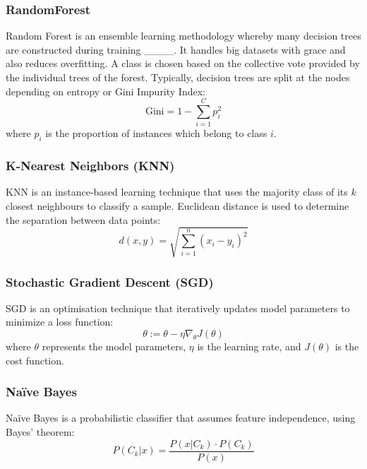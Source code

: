\vspace{\baselineskip}

\subsubsection{\textbf{RandomForest}}
Random Forest is an ensemble learning methodology whereby many decision trees are constructed during training ____. It handles big datasets with grace and also reduces overfitting. A class is chosen based on the collective vote provided by the individual trees of the forest. Typically, decision trees are split at the nodes depending on entropy or Gini Impurity Index:
\begin{equation}
    \text{Gini} = 1 - \sum_{i=1}^{C} p_i^2
\end{equation}
where \( p_i \) is the proportion of instances which belong to class \( i \).

\vspace{\baselineskip}

\subsubsection{\textbf{K-Nearest Neighbors (KNN)}}
KNN is an instance-based learning technique that uses the majority class of its \( k \) closest neighbours to classify a sample. Euclidean distance is used to determine the separation between data points:
\begin{equation}
    d(x, y) = \sqrt{\sum_{i=1}^{n} (x_i - y_i)^2}
\end{equation}
\vspace{\baselineskip}

\subsubsection{\textbf{Stochastic Gradient Descent (SGD)}}
SGD is an optimisation technique that iteratively updates model parameters to minimize a loss function:
\begin{equation}
    \theta := \theta - \eta \nabla_\theta J(\theta)
\end{equation}
where \( \theta \) represents the model parameters, \( \eta \) is the learning rate, and \( J(\theta) \) is the cost function.
\vspace{\baselineskip}

\subsubsection{\textbf{Naïve Bayes}}
Naïve Bayes is a probabilistic classifier that assumes feature independence, using Bayes' theorem:
\begin{equation}
    P(C_k | x) = \frac{P(x | C_k) \cdot P(C_k)}{P(x)}
\end{equation}

